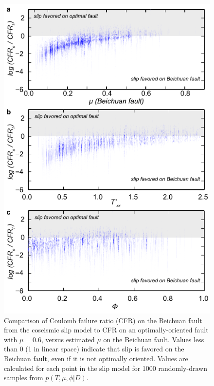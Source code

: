 \documentclass[twocolumn,jgrga]{AGUTeX}
\begin{document}
\begin{article}
{\begin{figure}%
\centering
\includegraphics{../figures/cfr_plots.pdf}
\caption{Comparison of Coulomb failure ratio (CFR) on the Beichuan fault
from the \citet{zhang2011} coseismic slip model to CFR on an
optimally-oriented fault with $\mu = 0.6$, versus estimated $\mu$ on the
Beichuan fault. Values less than 0 (1 in linear space) indicate that
slip is favored on the Beichuan fault, even if it is not optimally
oriented. Values are calculated for each point in the slip model for
1000 randomly-drawn samples from $p(T,\mu,\phi |D)$.}
\label{fig:cfr_ratios}
\end{figure}

}
\end{article}
\end{document}
